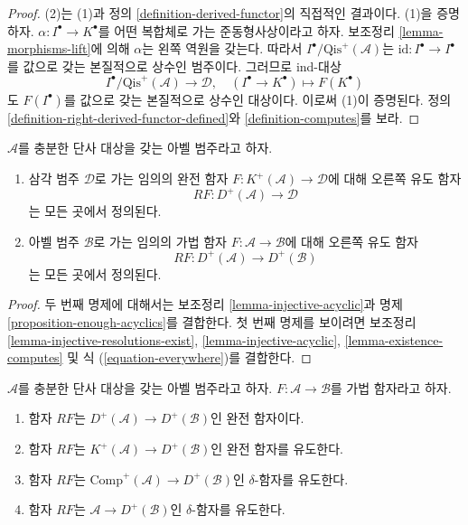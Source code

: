 \begin{proof}
(2)는 (1)과 정의 \ref{definition-derived-functor}의 직접적인 결과이다.
(1)을 증명하자. $\alpha : I^\bullet \to K^\bullet$를 어떤 복합체로 가는
준동형사상이라고 하자. 보조정리 \ref{lemma-morphisms-lift}에 의해
$\alpha$는 왼쪽 역원을 갖는다. 따라서
$I^\bullet/\text{Qis}^{+}(\mathcal{A})$는
$\text{id} : I^\bullet \to I^\bullet$를 값으로 갖는 본질적으로 상수인
범주이다. 그러므로 ind-대상
$$
I^\bullet/\text{Qis}^{+}(\mathcal{A}) \longrightarrow \mathcal{D}, \quad
(I^\bullet \to K^\bullet) \longmapsto F(K^\bullet)
$$
도 $F(I^\bullet)$를 값으로 갖는 본질적으로 상수인 대상이다.
이로써 (1)이 증명된다. 정의
\ref{definition-right-derived-functor-defined}와
\ref{definition-computes}를 보라.
\end{proof}

\begin{lemma}
\label{lemma-enough-injectives-right-derived}
$\mathcal{A}$를 충분한 단사 대상을 갖는 아벨 범주라고 하자.
\begin{enumerate}
\item 삼각 범주 $\mathcal{D}$로 가는 임의의 완전 함자
$F : K^{+}(\mathcal{A}) \to \mathcal{D}$에 대해 오른쪽 유도 함자
$$
RF : D^{+}(\mathcal{A}) \longrightarrow \mathcal{D}
$$
는 모든 곳에서 정의된다.
\item 아벨 범주 $\mathcal{B}$로 가는 임의의 가법 함자
$F : \mathcal{A} \to \mathcal{B}$에 대해 오른쪽 유도 함자
$$
RF : D^{+}(\mathcal{A}) \longrightarrow D^{+}(\mathcal{B})
$$
는 모든 곳에서 정의된다.
\end{enumerate}
\end{lemma}

\begin{proof}
두 번째 명제에 대해서는 보조정리
\ref{lemma-injective-acyclic}과 명제 \ref{proposition-enough-acyclics}를
결합한다. 첫 번째 명제를 보이려면 보조정리
\ref{lemma-injective-resolutions-exist},
\ref{lemma-injective-acyclic}, \ref{lemma-existence-computes} 및
식 (\ref{equation-everywhere})를 결합한다.
\end{proof}

\begin{lemma}
\label{lemma-right-derived-properties}
$\mathcal{A}$를 충분한 단사 대상을 갖는 아벨 범주라고 하자.
$F : \mathcal{A} \to \mathcal{B}$를 가법 함자라고 하자.
\begin{enumerate}
\item 함자 $RF$는
$D^{+}(\mathcal{A}) \to D^{+}(\mathcal{B})$인 완전 함자이다.
\item 함자 $RF$는
$K^{+}(\mathcal{A}) \to D^{+}(\mathcal{B})$인 완전 함자를 유도한다.
\item 함자 $RF$는
$\text{Comp}^{+}(\mathcal{A}) \to D^{+}(\mathcal{B})$인
$\delta$-함자를 유도한다.
\item 함자 $RF$는
$\mathcal{A} \to D^{+}(\mathcal{B})$인 $\delta$-함자를 유도한다.
\end{enumerate}
\end{lemma}


